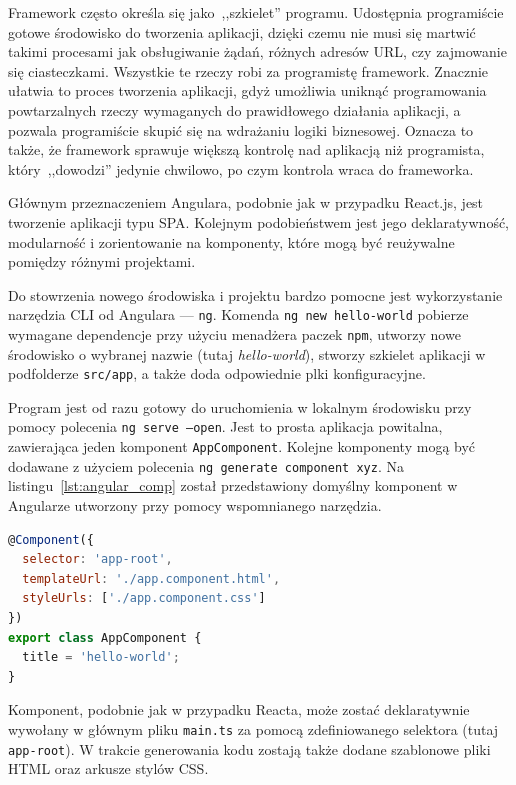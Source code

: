 \documentclass[twoside,a4paper]{report}
\begin{document}
Framework często określa się jako~,,szkielet'' programu.
Udostępnia programiście gotowe środowisko do tworzenia aplikacji, dzięki czemu nie musi się martwić takimi procesami jak obsługiwanie żądań, różnych adresów URL, czy zajmowanie się ciasteczkami.
Wszystkie te rzeczy robi za programistę framework.
Znacznie ułatwia to proces tworzenia aplikacji, gdyż umożliwia uniknąć programowania powtarzalnych rzeczy wymaganych do prawidłowego działania aplikacji, a pozwala programiście skupić się na wdrażaniu logiki biznesowej.
Oznacza to także, że framework sprawuje większą kontrolę nad aplikacją niż programista, który~,,dowodzi'' jedynie chwilowo, po czym kontrola wraca do frameworka.

Głównym przeznaczeniem Angulara, podobnie jak w przypadku React.js, jest tworzenie aplikacji typu SPA\@.
Kolejnym podobieństwem jest jego deklaratywność, modularność i zorientowanie na komponenty, które mogą być reużywalne pomiędzy różnymi projektami.

Do stowrzenia nowego środowiska i projektu bardzo pomocne jest wykorzystanie narzędzia CLI od Angulara --- \texttt{ng}.
Komenda \texttt{ng new hello-world} pobierze wymagane dependencje przy użyciu menadżera paczek \texttt{npm}, utworzy nowe środowisko o wybranej nazwie (tutaj \textit{hello-world}), stworzy szkielet aplikacji w podfolderze \texttt{src/app}, a także doda odpowiednie plki konfiguracyjne.

Program jest od razu gotowy do uruchomienia w lokalnym środowisku przy pomocy polecenia \texttt{ng serve --open}.
Jest to prosta aplikacja powitalna, zawierająca jeden komponent \texttt{AppComponent}.
Kolejne komponenty mogą być dodawane z użyciem polecenia \texttt{ng generate component xyz}.
Na listingu~\ref{lst:angular_comp} został przedstawiony domyślny komponent w Angularze utworzony przy pomocy wspomnianego narzędzia.

\begin{lstlisting}[caption={Domyślny komponent w Angularze},label={lst:angular_comp},language=JavaScript]
@Component({
  selector: 'app-root',
  templateUrl: './app.component.html',
  styleUrls: ['./app.component.css']
})
export class AppComponent {
  title = 'hello-world';
}
\end{lstlisting}

Komponent, podobnie jak w przypadku Reacta, może zostać deklaratywnie wywołany w głównym pliku \texttt{main.ts} za pomocą zdefiniowanego selektora (tutaj \texttt{app-root}).
W trakcie generowania kodu zostają także dodane szablonowe pliki HTML oraz arkusze stylów CSS\@.
\end{document}
